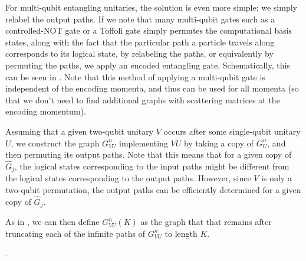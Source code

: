\documentclass[../thesis-main/thesis-main]{subfiles}
\begin{document}


For multi-qubit entangling unitaries, the solution is even more simple; we simply relabel the output paths.  If we note that many multi-qubit gates such as a controlled-NOT gate or a Toffoli gate simply permutes the computational basis states, along with the fact that the particular path a particle travels along corresponds to its logical state, by relabeling the paths, or equivalently by permuting the paths, we apply an encoded entangling gate.  Schematically, this can be seen in .  Note that this method of applying a multi-qubit gate is independent of the encoding momenta, and thus can be used for all momenta (so that we don't need to find additional graphs with scattering matrices at the encoding momentum).  

Assuming that a given two-qubit unitary $V$ occurs after some single-qubit unitary $U$, we construct the graph $G_{VU}^n$ implementing $VU$ by taking a copy of $G_U^n$, and then permuting its output paths.  Note that this means that for a given copy of $\widehat{G}_j$, the logical states corresponding to the input paths might be different from the logical states corresponding to the output paths.  However, since $V$ is only a two-qubit permutation, the output paths can be efficiently determined for a given copy of $\widehat{G}_j$.

As in , we can then define $G_{VU}^n(K)$ as the graph that that remains after truncating each of the infinite paths of $G_{VU}^n$ to length $K$.

.
\end{document}
